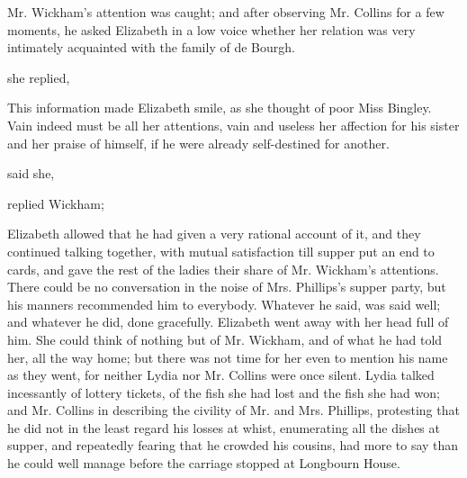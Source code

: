 Mr. Wickham's attention was caught; and after observing Mr. Collins for a few moments, he asked Elizabeth in a low voice whether her relation was very intimately acquainted with the family of de Bourgh.

 she replied, 




This information made Elizabeth smile, as she thought of poor Miss Bingley. Vain indeed must be all her attentions, vain and useless her affection for his sister and her praise of himself, if he were already self-destined for another.

 said she, 

 replied Wickham; 

Elizabeth allowed that he had given a very rational account of it, and they continued talking together, with mutual satisfaction till supper put an end to cards, and gave the rest of the ladies their share of Mr. Wickham's attentions. There could be no conversation in the noise of Mrs. Phillips's supper party, but his manners recommended him to everybody. Whatever he said, was said well; and whatever he did, done gracefully. Elizabeth went away with her head full of him. She could think of nothing but of Mr. Wickham, and of what he had told her, all the way home; but there was not time for her even to mention his name as they went, for neither Lydia nor Mr. Collins were once silent. Lydia talked incessantly of lottery tickets, of the fish she had lost and the fish she had won; and Mr. Collins in describing the civility of Mr. and Mrs. Phillips, protesting that he did not in the least regard his losses at whist, enumerating all the dishes at supper, and repeatedly fearing that he crowded his cousins, had more to say than he could well manage before the carriage stopped at Longbourn House.

